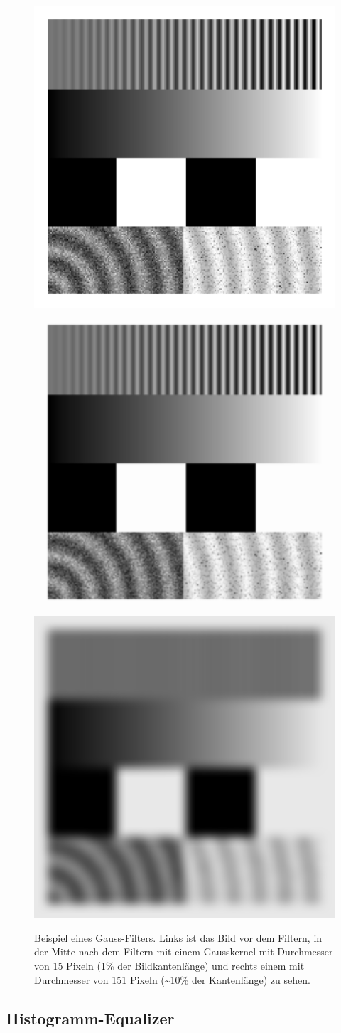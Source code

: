 \documentclass[
  12pt,
  openany]{book}
\begin{document}
\begin{figure}

{\centering \includegraphics[width=.32\textwidth]{../imgs/geometric} \includegraphics[width=.32\textwidth]{../imgs/gauss15} \includegraphics[width=.32\textwidth]{../imgs/gauss150} 

}

\caption[Beispiel eines Gauss-Filters.]{Beispiel eines Gauss-Filters. Links ist das Bild vor dem Filtern, in der Mitte nach dem Filtern mit einem Gausskernel mit Durchmesser von 15 Pixeln (1\% der Bildkantenlänge) und rechts einem mit Durchmesser von 151 Pixeln (\textasciitilde10\% der Kantenlänge) zu sehen.}\label{fig:gaussFilter}
\end{figure}

\hypertarget{histogramm-equalizer}{%
\subsection{Histogramm-Equalizer}\label{histogramm-equalizer}}
\end{document}
